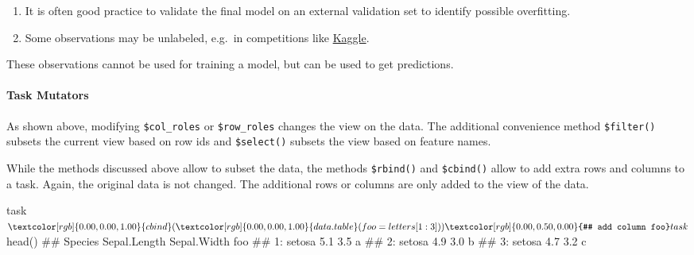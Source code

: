 \documentclass[]{article}
\newenvironment{Shaded}{}{}
\newcommand{\CommentTok}[1]{\textcolor[rgb]{0.00,0.50,0.00}{#1}}
\newcommand{\DataTypeTok}[1]{#1}
\newcommand{\DecValTok}[1]{#1}
\newcommand{\KeywordTok}[1]{\textcolor[rgb]{0.00,0.00,1.00}{#1}}
\newcommand{\NormalTok}[1]{#1}
\newcommand{\OperatorTok}[1]{#1}
\newcommand{\StringTok}[1]{\textcolor[rgb]{0.00,0.50,0.50}{#1}}
\providecommand{\tightlist}{%
  \setlength{\itemsep}{0pt}\setlength{\parskip}{0pt}}
\let\oldparagraph\paragraph
\renewcommand{\paragraph}[1]{\oldparagraph{#1}\mbox{}}
\renewenvironment{Shaded} {\begin{snugshade}\small} {\end{snugshade}}
\begin{document}
\begin{enumerate}
\def\labelenumi{\arabic{enumi}.}
\tightlist
\item
  It is often good practice to validate the final model on an external validation set to identify possible overfitting.
\item
  Some observations may be unlabeled, e.g.~in competitions like \href{https://www.kaggle.com/}{Kaggle}.
\end{enumerate}

These observations cannot be used for training a model, but can be used to get predictions.

\hypertarget{tasks-mutators}{%
\paragraph{Task Mutators}\label{tasks-mutators}}

As shown above, modifying \texttt{\$col\_roles} or \texttt{\$row\_roles} changes the view on the data.
The additional convenience method \texttt{\$filter()} subsets the current view based on row ids and \texttt{\$select()} subsets the view based on feature names.

\begin{Shaded}
\end{Shaded}

While the methods discussed above allow to subset the data, the methods \texttt{\$rbind()} and \texttt{\$cbind()} allow to add extra rows and columns to a task.
Again, the original data is not changed.
The additional rows or columns are only added to the view of the data.

\begin{Shaded}
\begin{Highlighting}[]
\NormalTok{task}\OperatorTok{$}\KeywordTok{cbind}\NormalTok{(}\KeywordTok{data.table}\NormalTok{(}\DataTypeTok{foo =}\NormalTok{ letters[}\DecValTok{1}\OperatorTok{:}\DecValTok{3}\NormalTok{])) }\CommentTok{# add column foo}
\NormalTok{task}\OperatorTok{$}\KeywordTok{head}\NormalTok{()}
\NormalTok{##    Species Sepal.Length Sepal.Width foo}
\NormalTok{## 1:  setosa          5.1         3.5   a}
\NormalTok{## 2:  setosa          4.9         3.0   b}
\NormalTok{## 3:  setosa          4.7         3.2   c}
\end{Highlighting}
\end{Shaded}
\end{document}

